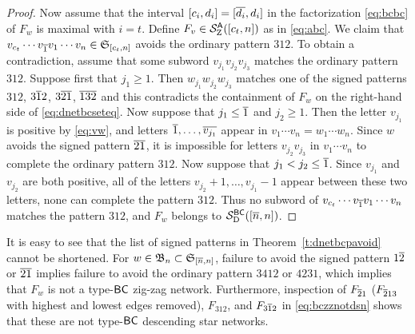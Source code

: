 \documentclass[11pt]{article}
\theoremstyle{definition}
\numberwithin{equation}{section}
\begin{document}
\begin{proof}
  Now assume that the interval $[c_i,d_i] = [\overline{d_i},d_i]$
  in the factorization \eqref{eq:bcbc} of $F_w$
  is maximal with $i=t$.
  Define $F_v \in \mathcal S^{\mathsf{A}}_{\mathrm Z}([c_t,n])$ as in \eqref{eq:abc}.
  We claim that
  $v_{c_t} \cdots v_{\overline{1}} v_1 \cdots v_n \in \mathfrak{S}_{[c_t,n]}$
  avoids the ordinary pattern $312$.
  To obtain a contradiction,
  assume that some subword
  $v_{j_1} v_{j_2} v_{j_3}$
  matches the ordinary pattern $312$.
  Suppose first that $j_1 \geq 1$. Then 
  $w_{j_1} w_{j_2} w_{j_3}$
  matches one of the signed patterns $312$, $3\overline{1}2$, $3\overline{2}\overline{1}$,
  $\overline{1}\overline{3}\overline{2}$ and this contradicts the containment of $F_w$ on the
  right-hand side of \eqref{eq:dnetbcseteq}.
  Now suppose that $j_1 \leq \overline{1}$ and $j_2 \geq 1$.
  Then the letter $v_{j_1}$ is positive by \eqref{eq:vw},
  and letters $\overline{1}, \dotsc, \overline{v_{j_1}}$ appear in
  $v_1 \cdots v_n = w_1 \cdots w_n$.
  Since $w$ avoids the signed pattern $\overline{2}\overline{1}$, it is  
  impossible for
  letters $v_{j_2}v_{j_3}$ in $v_1 \cdots v_n$
  to complete the ordinary pattern $312$.
  Now suppose that $j_1 < j_2 \leq \overline{1}$.
  Since $v_{j_1}$ and $v_{j_2}$ are both positive,
  all of the letters $v_{j_2} + 1, \dotsc, v_{j_1}-1$ appear between
  these two letters, none can complete the pattern $312$.
  Thus no subword of $v_{c_t} \cdots v_{\overline{1}} v_1 \cdots v_n$ matches
  the pattern $312$, and
  $F_w$ belongs to $\mathcal S^{\mathsf{BC}}_{\mathrm D}([\overline{n}, n])$.
\end{proof}
It is easy to see that the list of signed patterns in
Theorem~\ref{t:dnetbcpavoid} cannot be shortened.
For $w \in \mathfrak{B}_n \subset \mathfrak{S}_{\smash{[\overline{n}, n]}}$,
failure to avoid the signed pattern $1 \overline{2}$ or $\overline{2}\overline{1}$
implies failure to avoid the ordinary pattern $3412$ or $4231$,
which implies that $F_w$ is not a type-$\mathsf{BC}$ zig-zag network.
Furthermore, inspection of $F_{\overline{2}1}$
($F_{\overline{2}13}$ with highest and lowest edges removed),
$F_{312}$, and $F_{\smash{3\overline{1}2}}$ in \eqref{eq:bczznotdsn}
shows that these are not type-$\mathsf{BC}$ descending star networks.
\end{document}
